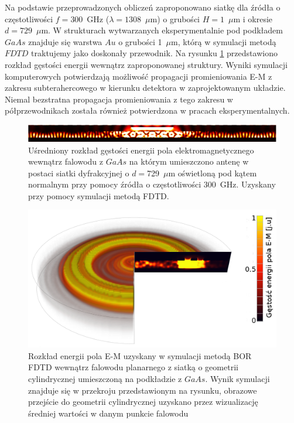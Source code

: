 Na podstawie przeprowadzonych obliczeń zaproponowano siatkę dla źródła o częstotliwości $f=300$~GHz ($\lambda=1308$~$\mu$m) o grubości $H=1$~$\mu$m i okresie $d=729$~$\mu$m. W strukturach wytwarzanych eksperymentalnie pod podkładem $GaAs$ znajduje się warstwa $Au$ o grubości 1~$\mu$m, którą w symulacji metodą $FDTD$ traktujemy jako doskonały przewodnik. Na rysunku \ref{fig:consrc_1d_f300Ghz} przedstawiono rozkład gęstości energii wewnątrz zaproponowanej struktury. Wyniki symulacji komputerowych potwierdzają  możliwość propagacji promieniowania E-M z zakresu subterahercowego w kierunku detektora w zaprojektowanym układzie. Niemal bezstratna propagacja promieniowania z tego zakresu w półprzewodnikach została również potwierdzona w pracach eksperymentalnych\cite{roux2002grating}.

\begin{figure}[tb]
	\includegraphics[width=\textwidth]{images/thz/consrc_siatka1d_300GHz_d729um.png}
	\caption{Uśredniony rozkład gęstości energii pola elektromagnetycznego wewnątrz falowodu z $GaAs$ na którym umieszczono antenę w postaci siatki dyfrakcyjnej o $d=$729~$\mu$m oświetloną pod kątem normalnym przy pomocy źródła o częstotliwości 300~GHz. Uzyskany przy pomocy symulacji metodą FDTD. }
	\label{fig:consrc_1d_f300Ghz}
\end{figure}

\begin{figure}[tb]
	\includegraphics[width=\textwidth]{images/antenaThz/tort.png}
	\caption{Rozkład energii pola E-M uzyskany w symulacji metodą BOR FDTD wewnątrz falowodu planarnego z siatką o geometrii cylindrycznej umieszczoną na podkładzie z $GaAs$. Wynik symulacji znajduje się w przekroju przedstawionym na rysunku, obrazowe przejście do geometrii cylindrycznej uzyskano przez wizualizację średniej wartości w danym punkcie falowodu}	
	\label{fig:concent_modfalo}
\end{figure}

